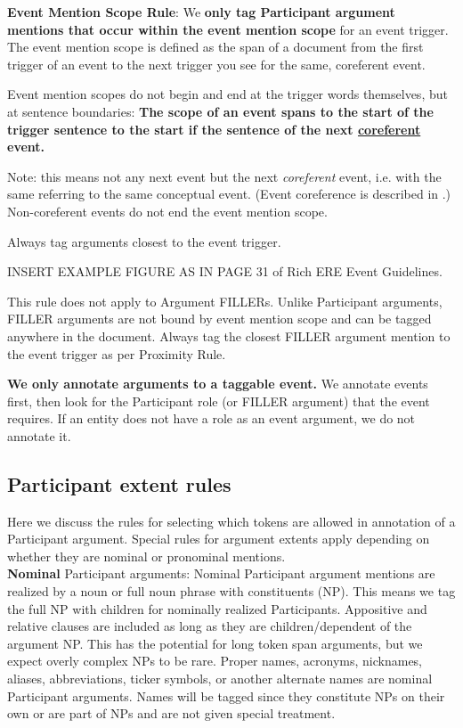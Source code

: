 \noindent\textbf{Event Mention Scope Rule}:
We \textbf{only tag Participant argument mentions that occur within the event mention scope} for an event trigger.
The event mention scope is defined as the span of a document from the first trigger of an event to the next trigger you see for the same, coreferent event.

Event mention scopes do not begin and end at the trigger words themselves, but at sentence boundaries:
\textbf{The scope of an event spans to the start of the trigger sentence to the start if the sentence of the next \underline{coreferent} event.}

Note: this means not any next event but the next \emph{coreferent} event, i.e. with the same  referring to the same conceptual event.
(Event coreference is described in .)
Non-coreferent events do not end the event mention scope.

Always tag arguments closest to the event trigger.

INSERT EXAMPLE FIGURE AS IN PAGE 31 of Rich ERE Event Guidelines.

This rule does not apply to Argument FILLERs.
Unlike Participant arguments, FILLER arguments are not bound by event mention scope and can be tagged anywhere in the document.
Always tag the closest FILLER argument mention to the event trigger as per Proximity Rule.

\noindent\textbf{We only annotate arguments to a taggable event.}
We annotate events first, then look for the Participant role (or FILLER argument) that the event requires. 
If an entity does not have a role as an event argument, we do not annotate it.\\

\subsection{Participant extent rules}
Here we discuss the rules for selecting which tokens are allowed in annotation of a Participant argument.
Special rules for argument extents apply depending on whether they are nominal or pronominal mentions.\\

\noindent\textbf{Nominal} Participant arguments:
Nominal Participant argument mentions are realized by a noun or full noun phrase with constituents (NP).
This means we tag the full NP with children for nominally realized Participants.
Appositive and relative clauses are included as long as they are children/dependent of the argument NP.
This has the potential for long token span arguments, but we expect overly complex NPs to be rare.
Proper names, acronyms, nicknames, aliases, abbreviations, ticker symbols, or another alternate names are nominal Participant arguments.
Names will be tagged since they constitute NPs on their own or are part of NPs and are not given special treatment.

